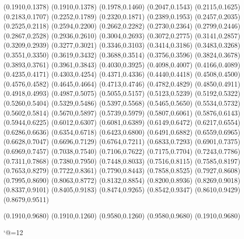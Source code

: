 \PST@Dotted(0.1910,0.1378)
(0.1910,0.1378)
(0.1978,0.1460)
(0.2047,0.1543)
(0.2115,0.1625)
(0.2183,0.1707)
(0.2252,0.1789)
(0.2320,0.1871)
(0.2389,0.1953)
(0.2457,0.2035)
(0.2525,0.2118)
(0.2594,0.2200)
(0.2662,0.2282)
(0.2730,0.2364)
(0.2799,0.2446)
(0.2867,0.2528)
(0.2936,0.2610)
(0.3004,0.2693)
(0.3072,0.2775)
(0.3141,0.2857)
(0.3209,0.2939)
(0.3277,0.3021)
(0.3346,0.3103)
(0.3414,0.3186)
(0.3483,0.3268)
(0.3551,0.3350)
(0.3619,0.3432)
(0.3688,0.3514)
(0.3756,0.3596)
(0.3824,0.3678)
(0.3893,0.3761)
(0.3961,0.3843)
(0.4030,0.3925)
(0.4098,0.4007)
(0.4166,0.4089)
(0.4235,0.4171)
(0.4303,0.4254)
(0.4371,0.4336)
(0.4440,0.4418)
(0.4508,0.4500)
(0.4576,0.4582)
(0.4645,0.4664)
(0.4713,0.4746)
(0.4782,0.4829)
(0.4850,0.4911)
(0.4918,0.4993)
(0.4987,0.5075)
(0.5055,0.5157)
(0.5123,0.5239)
(0.5192,0.5322)
(0.5260,0.5404)
(0.5329,0.5486)
(0.5397,0.5568)
(0.5465,0.5650)
(0.5534,0.5732)
(0.5602,0.5814)
(0.5670,0.5897)
(0.5739,0.5979)
(0.5807,0.6061)
(0.5876,0.6143)
(0.5944,0.6225)
(0.6012,0.6307)
(0.6081,0.6389)
(0.6149,0.6472)
(0.6217,0.6554)
(0.6286,0.6636)
(0.6354,0.6718)
(0.6423,0.6800)
(0.6491,0.6882)
(0.6559,0.6965)
(0.6628,0.7047)
(0.6696,0.7129)
(0.6764,0.7211)
(0.6833,0.7293)
(0.6901,0.7375)
(0.6969,0.7457)
(0.7038,0.7540)
(0.7106,0.7622)
(0.7175,0.7704)
(0.7243,0.7786)
(0.7311,0.7868)
(0.7380,0.7950)
(0.7448,0.8033)
(0.7516,0.8115)
(0.7585,0.8197)
(0.7653,0.8279)
(0.7722,0.8361)
(0.7790,0.8443)
(0.7858,0.8525)
(0.7927,0.8608)
(0.7995,0.8690)
(0.8063,0.8772)
(0.8132,0.8854)
(0.8200,0.8936)
(0.8269,0.9018)
(0.8337,0.9101)
(0.8405,0.9183)
(0.8474,0.9265)
(0.8542,0.9347)
(0.8610,0.9429)
(0.8679,0.9511)

\PST@Border(0.1910,0.9680)
(0.1910,0.1260)
(0.9580,0.1260)
(0.9580,0.9680)
(0.1910,0.9680)

\catcode`@=12
\fi
\endpspicture
